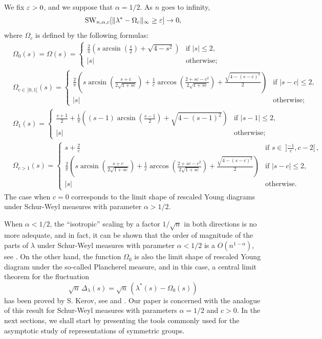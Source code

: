 \documentclass[10pt]{amsart}
\begin{document}
\begin{theorem}[First order asymptotics of Schur-Weyl measures of parameter $\alpha=1/2$]\label{firstasymptotic}
We fix $\varepsilon>0$, and we suppose that $\alpha=1/2$. As $n$ goes to infinity,
$$\mathrm{SW}_{n,\alpha,c}[\|\lambda^{*}-\Omega_{c} \|_{\infty} \geq \varepsilon]\to 0,$$ 
where $\Omega_{c}$ is defined by the following formulas:
\begin{align*}&\Omega_{0}(s)=\Omega(s)=\begin{cases}
            \frac{2}{\pi} \left(s \arcsin(\frac{s}{2})+\sqrt{4-s^2} \right) &\text{if }|s| \leq 2,\\
|s| &\text{otherwise;}
            \end{cases}\\
&\Omega_{c\in \,]0,1[}(s)=\begin{cases}
            \frac{2}{\pi} \left(s \arcsin(\frac{s+c}{2\sqrt{1+sc}})+\frac{1}{c}\arccos(\frac{2+sc-c^{2}}{2\sqrt{1+sc}})+\frac{\sqrt{4-(s-c)^2}}{2} \right) &\text{if }|s-c| \leq 2,\\
|s| &\text{otherwise;}
            \end{cases}\\
            &\Omega_{1}(s)=\begin{cases}
            \frac{s+1}{2}+\frac{1}{\pi}\left((s-1)\arcsin(\frac{s-1}{2})+\sqrt{4-(s-1)^{2}}\right)&\text{if }|s-1|\leq 2,\\
            |s|&\text{otherwise;}
            \end{cases}\\
            &\Omega_{c >1}(s)=\begin{cases}s+\frac{2}{c}&\text{if } s\in\,]\frac{-1}{c},c-2[\,,\\
            \frac{2}{\pi} \left(s \arcsin(\frac{s+c}{2\sqrt{1+sc}})+\frac{1}{c}\arccos(\frac{2+sc-c^{2}}{2\sqrt{1+sc}})+\frac{\sqrt{4-(s-c)^2}}{2} \right) &\text{if }|s-c| \leq 2,\\
|s| &\text{otherwise.}
            \end{cases}
\end{align*}
The case when $c=0$ corresponds to the limit shape of rescaled Young diagrams under Schur-Weyl measures with parameter $\alpha>1/2$.
\end{theorem}\bigskip


When $\alpha<1/2$, the ``isotropic'' scaling by a factor $1/\sqrt{n}$ in both directions is no more adequate, and in fact, it can be shown that the order of magnitude of the parts of $\lambda$ under Schur-Weyl measures with parameter $\alpha<1/2$ is a $O(n^{1-\alpha})$, see \cite[\S6]{FM10}. On the other hand, the function $\Omega_{0}$ is also the limit shape of rescaled Young diagram under the so-called Plancherel measure, and in this case, a central limit theorem for the fluctuation
$$\sqrt{n}\,\Delta_{\lambda}(s)=\sqrt{n}\,(\lambda^{*}(s)-\Omega_{0}(s))$$
has been proved by S. Kerov, see \cite{Ker93} and \cite{IO02}. Our paper is concerned with the analogue of this result for Schur-Weyl measures with parameters $\alpha=1/2$ and $c>0$. In the  next sections, we shall start by presenting the tools commonly used for the asymptotic study of representations of symmetric groups.
\bigskip
\bigskip
\end{document}

